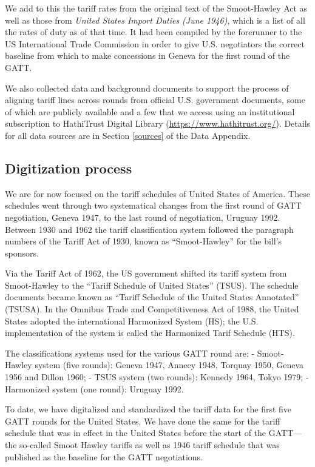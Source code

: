 \documentclass[
  12pt,
]{article}
\begin{document}
We add to this the tariff rates from the original text of the Smoot-Hawley Act as well as those from \emph{United States Import Duties (June 1946)}, which is a list of all the rates of duty as of that time. It had been compiled by the forerunner to the US International Trade Commission in order to give U.S. negotiators the correct baseline from which to make concessions in Geneva for the first round of the GATT.

We also collected data and background documents to support the process of aligning tariff lines across rounds from official U.S. government documents, some of which are publicly available and a few that we access using an institutional subscription to HathiTrust Digital Library (\url{https://www.hathitrust.org/}). Details for all data sources are in Section \ref{sources} of the Data Appendix.

\hypertarget{digitization-process}{%
\subsection{Digitization process}\label{digitization-process}}

We are for now focused on the tariff schedules of United States of America. These schedules went through two systematical changes from the first round of GATT negotiation, Geneva 1947, to the last round of negotiation, Uruguay 1992. Between 1930 and 1962 the tariff classification system followed the paragraph numbers of the Tariff Act of 1930, known as ``Smoot-Hawley'' for the bill's sponsors.

Via the Tariff Act of 1962, the US government shifted its tariff system from Smoot-Hawley to the ``Tariff Schedule of United States'' (TSUS). The schedule documents became known as ``Tariff Schedule of the United States Annotated'' (TSUSA). In the Omnibus Trade and Competitiveness Act of 1988, the United States adopted the international Harmonized System (HS); the U.S. implementation of the system is called the Harmonized Tarif Schedule (HTS).

The classifications systems used for the various GATT round are:
- Smoot-Hawley system (five rounds): Geneva 1947, Annecy 1948, Torquay 1950, Geneva 1956 and Dillon 1960;
- TSUS system (two rounds): Kennedy 1964, Tokyo 1979;
- Harmonized system (one round): Uruguay 1992.

To date, we have digitalized and standardized the tariff data for the first five GATT rounds for the United States. We have done the same for the tariff schedule that was in effect in the United States before the start of the GATT---the so-called Smoot Hawley tariffs as well as 1946 tariff schedule that was published as the baseline for the GATT negotiations.
\end{document}
